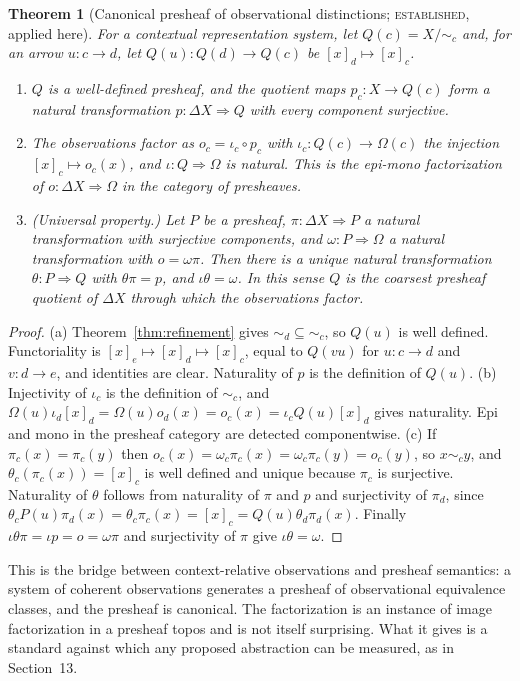\documentclass[11pt]{article}
\newtheorem{theorem}{Theorem}[section]
\theoremstyle{definition}
\theoremstyle{remark}
\newcommand{\stE}{\textsc{established}}
\newcommand{\sk}{\sim}
\begin{document}
\begin{theorem}[Canonical presheaf of observational distinctions; \stE, applied here]\label{thm:canonical}
For a contextual representation system, let $Q(c)=X/{\sk_c}$ and, for an arrow $u:c\to d$, let $Q(u):Q(d)\to Q(c)$ be $[x]_d\mapsto[x]_c$.
\begin{enumerate}[label=(\alph*)]
\item $Q$ is a well-defined presheaf, and the quotient maps $p_c:X\to Q(c)$ form a natural transformation $p:\Delta X\Rightarrow Q$ with every component surjective.
\item The observations factor as $o_c=\iota_c\circ p_c$ with $\iota_c:Q(c)\to\Omega(c)$ the injection $[x]_c\mapsto o_c(x)$, and $\iota:Q\Rightarrow\Omega$ is natural. This is the epi-mono factorization of $o:\Delta X\Rightarrow\Omega$ in the category of presheaves.
\item (Universal property.) Let $P$ be a presheaf, $\pi:\Delta X\Rightarrow P$ a natural transformation with surjective components, and $\omega:P\Rightarrow\Omega$ a natural transformation with $o=\omega\pi$. Then there is a unique natural transformation $\theta:P\Rightarrow Q$ with $\theta\pi=p$, and $\iota\theta=\omega$. In this sense $Q$ is the coarsest presheaf quotient of $\Delta X$ through which the observations factor.
\end{enumerate}
\end{theorem}
\begin{proof}
(a) Theorem~\ref{thm:refinement} gives ${\sk_d}\subseteq{\sk_c}$, so $Q(u)$ is well defined. Functoriality is $[x]_e\mapsto[x]_d\mapsto[x]_c$, equal to $Q(vu)$ for $u:c\to d$ and $v:d\to e$, and identities are clear. Naturality of $p$ is the definition of $Q(u)$. (b) Injectivity of $\iota_c$ is the definition of $\sk_c$, and $\Omega(u)\iota_d[x]_d=\Omega(u)o_d(x)=o_c(x)=\iota_cQ(u)[x]_d$ gives naturality. Epi and mono in the presheaf category are detected componentwise. (c) If $\pi_c(x)=\pi_c(y)$ then $o_c(x)=\omega_c\pi_c(x)=\omega_c\pi_c(y)=o_c(y)$, so $x\sk_c y$, and $\theta_c(\pi_c(x))=[x]_c$ is well defined and unique because $\pi_c$ is surjective. Naturality of $\theta$ follows from naturality of $\pi$ and $p$ and surjectivity of $\pi_d$, since $\theta_cP(u)\pi_d(x)=\theta_c\pi_c(x)=[x]_c=Q(u)\theta_d\pi_d(x)$. Finally $\iota\theta\pi=\iota p=o=\omega\pi$ and surjectivity of $\pi$ give $\iota\theta=\omega$.
\end{proof}

This is the bridge between context-relative observations and presheaf semantics: a system of coherent observations generates a presheaf of observational equivalence classes, and the presheaf is canonical. The factorization is an instance of image factorization in a presheaf topos and is not itself surprising. What it gives is a standard against which any proposed abstraction can be measured, as in Section~13.
\end{document}
